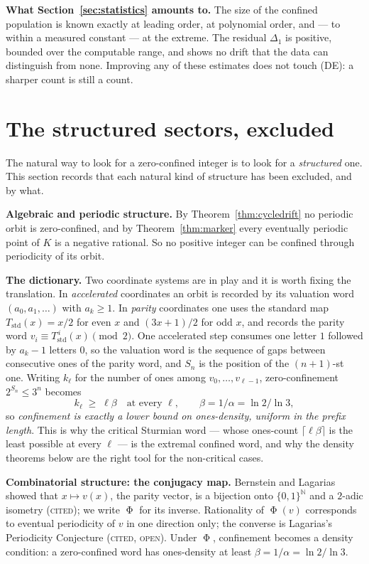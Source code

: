 \documentclass[11pt,reqno]{amsart}
\theoremstyle{plain}
\theoremstyle{definition}
\newcommand{\N}{\mathbb{N}}
\DeclareMathOperator{\Ph}{\Phi}
\newcommand{\lab}[1]{\textnormal{\textsc{\small #1}}}
\begin{document}
\medskip
\noindent\textbf{What Section~\ref{sec:statistics} amounts to.} The size of the
confined population is known exactly at leading order, at polynomial order, and
--- to within a measured constant --- at the extreme. The residual $\Delta_1$ is
positive, bounded over the computable range, and shows no drift that the data can
distinguish from none. Improving any of these estimates does not touch
\textup{(DE)}: a sharper count is still a count.

\section{The structured sectors, excluded}\label{sec:excluded}

The natural way to look for a zero-confined integer is to look for a
\emph{structured} one. This section records that each natural kind of structure
has been excluded, and by what.

\medskip
\noindent\textbf{Algebraic and periodic structure.} By Theorem~\ref{thm:cycledrift}
no periodic orbit is zero-confined, and by Theorem~\ref{thm:marker} every
eventually periodic point of $K$ is a negative rational. So no positive integer
can be confined through periodicity of its orbit.

\medskip
\noindent\textbf{The dictionary.} Two coordinate systems are in play and it is
worth fixing the translation. In \emph{accelerated} coordinates an orbit is
recorded by its valuation word $(a_0,a_1,\dots)$ with $a_k\ge1$. In
\emph{parity} coordinates one uses the standard map
$T_{\mathrm{std}}(x)=x/2$ for even $x$ and $(3x+1)/2$ for odd $x$, and records the
parity word $v_i\equiv T_{\mathrm{std}}^{\,i}(x)\pmod 2$. One accelerated step
consumes one letter $1$ followed by $a_k-1$ letters $0$, so the valuation word is
the sequence of gaps between consecutive ones of the parity word, and
$S_n$ is the position of the $(n+1)$-st one. Writing $k_\ell$ for the number of
ones among $v_0,\dots,v_{\ell-1}$, zero-confinement $2^{S_n}\le3^n$ becomes
\[
k_\ell\;\ge\;\ell\beta\quad\text{at every }\ell,\qquad \beta=1/\alpha=\ln2/\ln3,
\]
so \emph{confinement is exactly a lower bound on ones-density, uniform in the
prefix length}. This is why the critical Sturmian word --- whose ones-count
$\lceil\ell\beta\rceil$ is the least possible at every $\ell$ --- is the extremal
confined word, and why the density theorems below are the right tool for the
non-critical cases.

\medskip
\noindent\textbf{Combinatorial structure: the conjugacy map.} Bernstein and
Lagarias \cite{BernsteinLagarias1996,Bernstein1994} showed that
$x\mapsto v(x)$, the parity vector, is a bijection onto $\{0,1\}^{\N}$ and a
$2$-adic isometry (\lab{cited}); we write $\Ph$ for its inverse. Rationality of
$\Ph(v)$ corresponds to eventual periodicity of $v$ in one direction only; the
converse is Lagarias's Periodicity Conjecture \cite[\S2]{Lagarias1985}
(\lab{cited}, \lab{open}). Under $\Ph$, confinement becomes a density condition:
a zero-confined word has ones-density at least $\beta=1/\alpha=\ln2/\ln3$.
\end{document}
